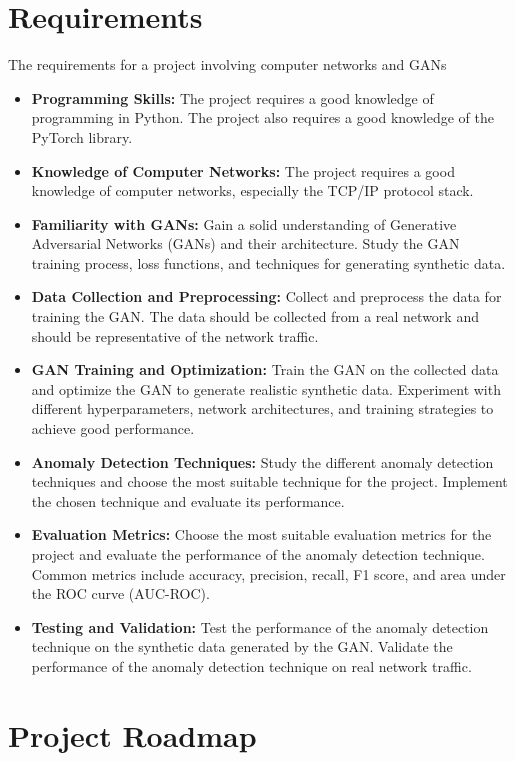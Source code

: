 \documentclass[12pt]{article}
\begin{document}
\section{Requirements}
The requirements for a project involving computer networks and GANs
\begin{itemize}
    \item \textbf{Programming Skills:} The project requires a good knowledge of programming in Python. The project also requires a good knowledge of the PyTorch library.
    \item \textbf{Knowledge of Computer Networks:} The project requires a good knowledge of computer networks, especially the TCP/IP protocol stack.
    \item \textbf{Familiarity with GANs:} Gain a solid understanding of Generative Adversarial Networks (GANs) and their architecture. Study the GAN training process, loss functions, and techniques for generating synthetic data.
    \item \textbf{Data Collection and Preprocessing:} Collect and preprocess the data for training the GAN. The data should be collected from a real network and should be representative of the network traffic.
    \item \textbf{GAN Training and Optimization: } Train the GAN on the collected data and optimize the GAN to generate realistic synthetic data. Experiment with different hyperparameters, network architectures, and training strategies to achieve good performance.
    \item \textbf{Anomaly Detection Techniques:} Study the different anomaly detection techniques and choose the most suitable technique for the project. Implement the chosen technique and evaluate its performance.
    \item \textbf{Evaluation Metrics:} Choose the most suitable evaluation metrics for the project and evaluate the performance of the anomaly detection technique. Common metrics include accuracy, precision, recall, F1 score, and area under the ROC curve (AUC-ROC).
    \item \textbf{Testing and Validation:} Test the performance of the anomaly detection technique on the synthetic data generated by the GAN. Validate the performance of the anomaly detection technique on real network traffic.
\end{itemize}

\section{Project Roadmap}
\end{document}

